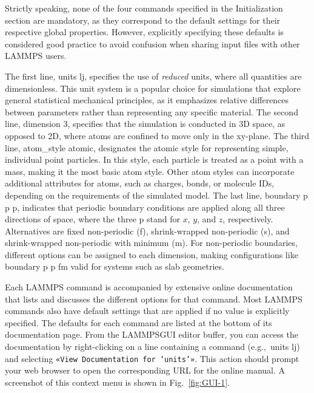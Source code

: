 \documentclass[9pt,tutorial]{livecoms}
\newcommand{\lmpcmd}[1]{\hspace{0pt}\colorbox{listing}{\textcolor{command}{\small{#1}}}\hspace{0pt}} %
\newcommand{\guicmd}[1]{\textcolor{command}{\texttt{«#1»}}} %
\newcommand{\lammpsgui}{\textsf{LAMMPS\textendash GUI}}
\begin{document}
\begin{note}
  Strictly speaking, none of the four commands specified in the
  Initialization section are mandatory, as they correspond to the
  default settings for their respective global properties.  However,
  explicitly specifying these defaults is considered good practice to
  avoid confusion when sharing input files with other LAMMPS users.
\end{note}

The first line, \lmpcmd{units lj}, specifies the use of \emph{reduced}
units, where all quantities are dimensionless.  This unit system is a
popular choice for simulations that explore general statistical
mechanical principles, as it emphasizes relative differences between
parameters rather than representing any specific material.  The second
line, \lmpcmd{dimension 3}, specifies that the simulation is conducted
in 3D space, as opposed to 2D, where atoms are confined to move only in
the xy-plane.  The third line, \lmpcmd{atom\_style atomic}, designates
the atomic style for representing simple, individual point particles.
In this style, each particle is treated as a point with a mass, making
it the most basic atom style.  Other atom styles can incorporate
additional attributes for atoms, such as charges, bonds, or molecule
IDs, depending on the requirements of the simulated model.  The last
line, \lmpcmd{boundary p p p}, indicates that periodic boundary
conditions are applied along all three directions of space, where the
three p stand for $x$, $y$, and $z$, respectively.  Alternatives are
fixed non-periodic (f), shrink-wrapped non-periodic (s), and
shrink-wrapped non-periodic with minimum (m).  For non-periodic
boundaries, different options can be assigned to each dimension, making
configurations like \lmpcmd{boundary p p fm} valid for systems such as
slab geometries.

\begin{note}
  Each LAMMPS command is accompanied by extensive online documentation
  that {\color{blue} lists and discusses} the different options for that
  command.  {\color{blue}Most LAMMPS commands also have default settings
    that are applied if no value is explicitly specified.  The defaults
    for each command are listed at the bottom of its documentation
    page.}  From the \lammpsgui{} editor buffer, you can access the
  documentation by right-clicking on a line containing a command
  (e.g.,~\lmpcmd{units lj}) and selecting \guicmd{View Documentation for
    `units'}.  This action should prompt your web browser to open the
  corresponding URL for the online manual.  A screenshot of this context
  menu is shown in Fig.~\ref{fig:GUI-1}.
\end{note}
\end{document}
